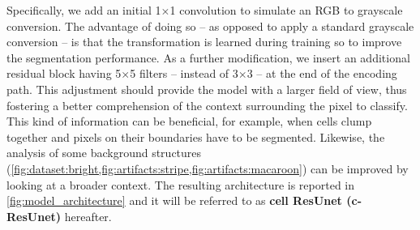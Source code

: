 Specifically, we add an initial 1$\times$1 convolution to simulate an RGB to grayscale conversion.
The advantage of doing so -- as opposed to apply a standard grayscale conversion -- is that the transformation is learned during training so to improve the segmentation performance.
As a further modification, we insert an additional residual block having 5$\times$5 filters -- instead of 3$\times$3 -- at the end of the encoding path. This adjustment should provide the model with a larger field of view, thus fostering a better comprehension of the context surrounding the pixel to classify.
This kind of information can be beneficial, for example, when cells clump together and pixels on their boundaries have to be segmented. 
Likewise, the analysis of some background structures (\cref{fig:dataset:bright,fig:artifacts:stripe,fig:artifacts:macaroon}) can be improved by looking at a broader context.
The resulting architecture is reported in \cref{fig:model_architecture} and it will be referred to as \textbf{cell ResUnet (c-ResUnet)} hereafter.